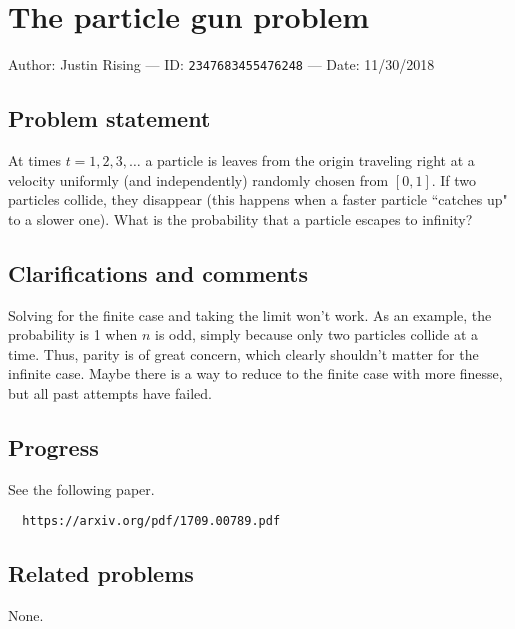 
\section{The particle gun problem}

Author: Justin Rising --- ID: \verb`2347683455476248` --- Date: 11/30/2018

\subsection{Problem statement}

At times $t=1,2,3,\ldots$ a particle is leaves from the origin traveling right at a velocity uniformly (and independently) randomly chosen from $[0,1]$. If two particles collide, they disappear (this happens when a faster particle ``catches up" to a slower one). What is the probability that a particle escapes to infinity?

\subsection{Clarifications and comments}

Solving for the finite case and taking the limit won't work. As an example, the probability is 1 when $n$ is odd, simply because only two particles collide at a time. Thus, parity is of great concern, which clearly shouldn't matter for the infinite case. Maybe there is a way to reduce to the finite case with more finesse, but all past attempts have failed.

\subsection{Progress}

See the following paper.

\begin{verbatim}
  https://arxiv.org/pdf/1709.00789.pdf
\end{verbatim}

\subsection{Related problems}

None.

